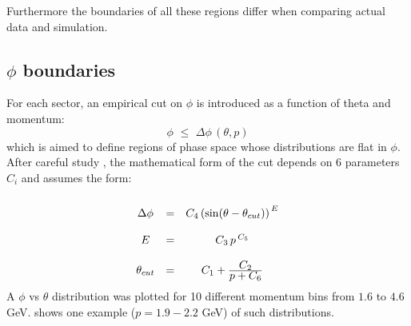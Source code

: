 Furthermore the boundaries of all these regions differ
when comparing actual data and simulation.

\subsection{ $\phi$ boundaries}
For each sector, an empirical cut on $\phi$ is introduced as a function of theta and momentum:
$$ 
 \phi \,\,\le\,\, \Delta\phi \,(\theta, p)
$$
which is aimed to define regions of phase space whose distributions are flat in $\phi$.
After careful study \cite{bib:fid_e}, the mathematical form of the cut depends on 6 parameters  $C_i$
and assumes the form:\vspace{-0.3 cm}
$$
\begin{array}{c c c}
\\
\Delta\phi   & = &  C_4 \left( \sin (\theta - \theta_{cut}) \right) ^{\,E} \\
\\
E        & = &  C_3\, p\, ^{C_5} \\
\\
\theta_{cut} & = &  C_1 + \frac{\displaystyle C_2}{\displaystyle p + C_6}
\end{array}
$$
A $\phi$ vs $\theta$ distribution was plotted for 10 different momentum bins from $1.6$ to $4.6$ GeV.
 shows one example ($p=1.9-2.2$ GeV) of such distributions.
